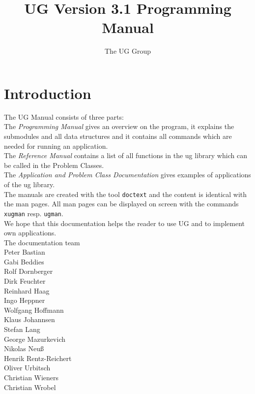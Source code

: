 


\pagestyle{myheadings}
\sloppy
\makeindex


\newcommand{\sectitle}{\mbox{}}
\setcounter{page}{0}

\title{UG Version 3.1 Programming Manual}
\author{The UG Group}

\maketitle


\section*{Introduction}

The UG Manual consists of three parts:
\\[5mm]  
The {\em Programming Manual} gives an overview on the program, it
explains the submodules and all data structures and it contains
all commands which are needed for running an application.
\\[5mm]  
The {\em Reference Manual} contains a list of all 
functions in the ug library which can be called in the Problem Classes.
\\[5mm]
The {\em Application and Problem Class Documentation} gives examples
of applications of the ug library.
\\[5mm]
The manuals are created with the tool {\tt doctext} and the content is 
identical with the man pages. All man pages can be displayed on screen 
with the commands {\tt xugman} resp. {\tt ugman}.
\\[5mm]
We hope that this documentation helps the reader to use UG 
and to implement own applications.
\\[1cm]
The documentation team
\\[1cm]
Peter Bastian\\
Gabi Beddies\\
Rolf Dornberger\\
Dirk Feuchter\\
Reinhard Haag\\
Ingo Heppner\\
Wolfgang Hoffmann\\
Klaus Johannsen\\
Stefan Lang\\
George Mazurkevich\\
Nikolas Neu\ss\\
Henrik Rentz-Reichert\\
Oliver Urbitsch\\
Christian Wieners\\
Christian Wrobel


